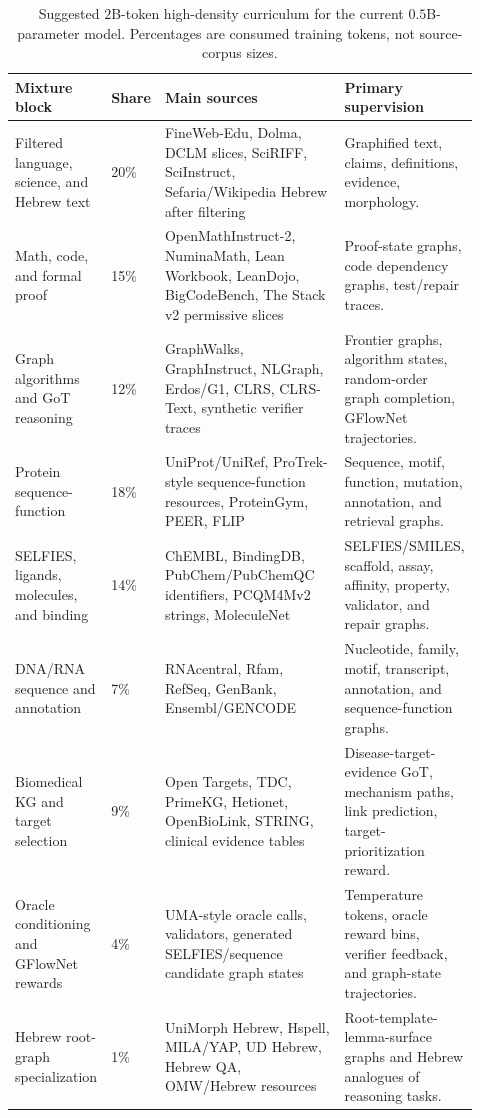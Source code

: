 \documentclass[11pt]{article}
\newcommand{\1}{\mathbf{1}}
\begin{document}
{\scriptsize
\setlength{\tabcolsep}{2pt}
\begin{longtable}{p{0.20\linewidth}p{0.09\linewidth}p{0.43\linewidth}p{0.20\linewidth}}
\caption{Suggested $2$B-token high-density curriculum for the current $0.5$B-parameter model. Percentages are consumed training tokens, not source-corpus sizes.}\\
\toprule
Mixture block & Share & Main sources & Primary supervision \\
\midrule
\endhead
Filtered language, science, and Hebrew text & 20\% & FineWeb-Edu, Dolma, DCLM slices, SciRIFF, SciInstruct, Sefaria/Wikipedia Hebrew after filtering & Graphified text, claims, definitions, evidence, morphology. \\
Math, code, and formal proof & 15\% & OpenMathInstruct-2, NuminaMath, Lean Workbook, LeanDojo, BigCodeBench, The Stack v2 permissive slices & Proof-state graphs, code dependency graphs, test/repair traces. \\
Graph algorithms and GoT reasoning & 12\% & GraphWalks, GraphInstruct, NLGraph, Erdos/G1, CLRS, CLRS-Text, synthetic verifier traces & Frontier graphs, algorithm states, random-order graph completion, GFlowNet trajectories. \\
Protein sequence-function & 18\% & UniProt/UniRef, ProTrek-style sequence-function resources, ProteinGym, PEER, FLIP & Sequence, motif, function, mutation, annotation, and retrieval graphs. \\
SELFIES, ligands, molecules, and binding & 14\% & ChEMBL, BindingDB, PubChem/PubChemQC identifiers, PCQM4Mv2 strings, MoleculeNet & SELFIES/SMILES, scaffold, assay, affinity, property, validator, and repair graphs. \\
DNA/RNA sequence and annotation & 7\% & RNAcentral, Rfam, RefSeq, GenBank, Ensembl/GENCODE & Nucleotide, family, motif, transcript, annotation, and sequence-function graphs. \\
Biomedical KG and target selection & 9\% & Open Targets, TDC, PrimeKG, Hetionet, OpenBioLink, STRING, clinical evidence tables & Disease-target-evidence GoT, mechanism paths, link prediction, target-prioritization reward. \\
Oracle conditioning and GFlowNet rewards & 4\% & UMA-style oracle calls, validators, generated SELFIES/sequence candidate graph states & Temperature tokens, oracle reward bins, verifier feedback, and graph-state trajectories. \\
Hebrew root-graph specialization & 1\% & UniMorph Hebrew, Hspell, MILA/YAP, UD Hebrew, Hebrew QA, OMW/Hebrew resources & Root-template-lemma-surface graphs and Hebrew analogues of reasoning tasks. \\
\bottomrule
\end{longtable}}
\end{document}
